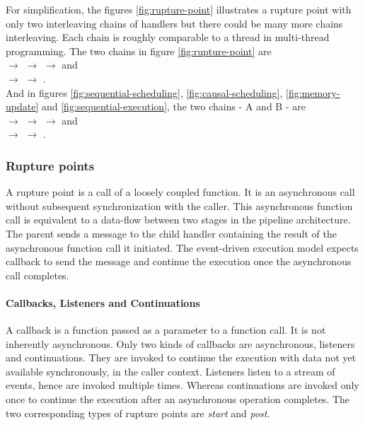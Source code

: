 For simplification, the figures \ref{fig:rupture-point} illustrates a rupture point with only two interleaving chains of handlers but there could be many more chains interleaving.
Each chain is roughly comparable to a thread in multi-thread programming.
The two chains in figure \ref{fig:rupture-point} are \\
$\to$
 $\to$
 $\to$ and \\
\dotcircled{\textcolor{white}{0}} $\to$
\dotcircled{\textcolor{white}{0}} $\to$
\dotcircled{\textcolor{white}{0}}.\\
And in figures \ref{fig:sequential-scheduling},  \ref{fig:causal-scheduling}, \ref{fig:memory-update} and \ref{fig:sequential-execution}, the two chains - {\figcapfont A} and {\figcapfont B} - are \\
$\to$
 $\to$
 $\to$ and \\
\dotcircled{\textcolor{white}{0}} $\to$
 $\to$
\dotcircled{\textcolor{white}{0}}.

\subsubsection{Rupture points} \label{chapter5:flx-compiler:analyzer:rupture}

A rupture point is a call of a loosely coupled function.
It is an asynchronous call without subsequent synchronization with the caller.
This asynchronous function call is equivalent to a data-flow between two stages in the pipeline architecture.
The parent sends a message to the child handler containing the result of the asynchronous function call it initiated.
The event-driven execution model expects callback to send the message and continue the execution once the asynchronous call completes.

\paragraph{Callbacks, Listeners and Continuations}

A callback is a function passed as a parameter to a function call.
It is not inherently asynchronous.
Only two kinds of callbacks are asynchronous, listeners and continuations.
They are invoked to continue the execution with data not yet available synchronously, in the caller context.
Listeners listen to a stream of events, hence are invoked multiple times.
Whereas continuations are invoked only once to continue the execution after an asynchronous operation completes.
The two corresponding types of rupture points are \textit{start} and \textit{post}.

